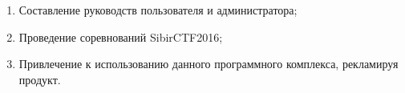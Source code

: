 \begin{enumerate}
\item Составление руководств пользователя и администратора;
\item Проведение соревнований SibirCTF2016;
\item Привлечение к использованию данного программного комплекса, рекламируя продукт.
\end{enumerate}